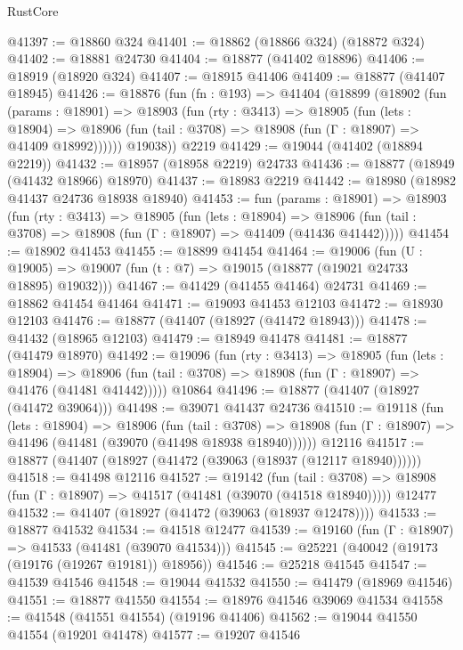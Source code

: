 \begin{lexlean}{RustCore}
\begin{coremodule}
@41397 := @18860 @324
@41401 := @18862 (@18866 @324) (@18872 @324)
@41402 := @18881 @24730
@41404 := @18877 (@41402 @18896)
@41406 := @18919 (@18920 @324)
@41407 := @18915 @41406
@41409 := @18877 (@41407 @18945)
@41426 := @18876
    (fun (fn : @193) =>
    @41404
      (@18899
        (@18902
          (fun (params : @18901) =>
          @18903
            (fun (rty : @3413) =>
            @18905
              (fun (lets : @18904) =>
              @18906 (fun (tail : @3708) => @18908 (fun (Γ : @18907) => @41409 @18992))))))
        @19038))
    @2219
@41429 := @19044 (@41402 (@18894 @2219))
@41432 := @18957 (@18958 @2219) @24733
@41436 := @18877 (@18949 (@41432 @18966) @18970)
@41437 := @18983 @2219
@41442 := @18980 (@18982 @41437 @24736 @18938 @18940)
@41453 := fun (params : @18901) =>
  @18903
    (fun (rty : @3413) =>
    @18905
      (fun (lets : @18904) =>
      @18906 (fun (tail : @3708) => @18908 (fun (Γ : @18907) => @41409 (@41436 @41442)))))
@41454 := @18902 @41453
@41455 := @18899 @41454
@41464 := @19006
    (fun (U : @19005) => @19007 (fun (t : @7) => @19015 (@18877 (@19021 @24733 @18895) @19032)))
@41467 := @41429 (@41455 @41464) @24731
@41469 := @18862 @41454 @41464
@41471 := @19093 @41453 @12103
@41472 := @18930 @12103
@41476 := @18877 (@41407 (@18927 (@41472 @18943)))
@41478 := @41432 (@18965 @12103)
@41479 := @18949 @41478
@41481 := @18877 (@41479 @18970)
@41492 := @19096
    (fun (rty : @3413) =>
    @18905
      (fun (lets : @18904) =>
      @18906 (fun (tail : @3708) => @18908 (fun (Γ : @18907) => @41476 (@41481 @41442)))))
    @10864
@41496 := @18877 (@41407 (@18927 (@41472 @39064)))
@41498 := @39071 @41437 @24736
@41510 := @19118
    (fun (lets : @18904) =>
    @18906
      (fun (tail : @3708) =>
      @18908 (fun (Γ : @18907) => @41496 (@41481 (@39070 (@41498 @18938 @18940))))))
    @12116
@41517 := @18877 (@41407 (@18927 (@41472 (@39063 (@18937 (@12117 @18940))))))
@41518 := @41498 @12116
@41527 := @19142
    (fun (tail : @3708) => @18908 (fun (Γ : @18907) => @41517 (@41481 (@39070 (@41518 @18940)))))
    @12477
@41532 := @41407 (@18927 (@41472 (@39063 (@18937 @12478))))
@41533 := @18877 @41532
@41534 := @41518 @12477
@41539 := @19160 (fun (Γ : @18907) => @41533 (@41481 (@39070 @41534)))
@41545 := @25221 (@40042 (@19173 (@19176 (@19267 @19181)) @18956))
@41546 := @25218 @41545
@41547 := @41539 @41546
@41548 := @19044 @41532
@41550 := @41479 (@18969 @41546)
@41551 := @18877 @41550
@41554 := @18976 @41546 @39069 @41534
@41558 := @41548 (@41551 @41554) (@19196 @41406)
@41562 := @19044 @41550 @41554 (@19201 @41478)
@41577 := @19207
    @41546

\end{coremodule}
\end{lexlean}
